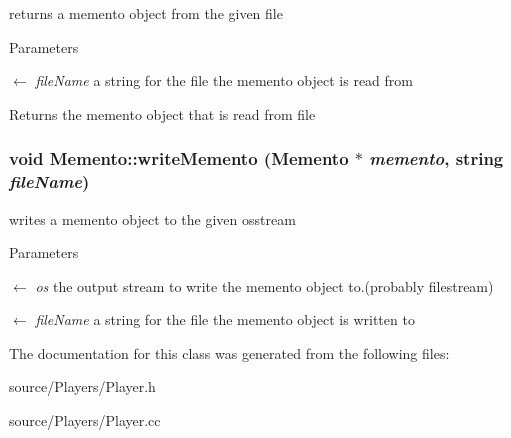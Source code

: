 returns a memento object from the given file 
\begin{DoxyParams}{Parameters}
\item[\mbox{$\leftarrow$} {\em fileName}]a string for the file the memento object is read from \end{DoxyParams}
\begin{DoxyReturn}{Returns}
the memento object that is read from file 
\end{DoxyReturn}
\hypertarget{classMemento_ae1c59cf9a5ed24dfcbe15d57ee24c095}{
\subsubsection[{writeMemento}]{\setlength{\rightskip}{0pt plus 5cm}void Memento::writeMemento ({\bf Memento} $\ast$ {\em memento}, \/  string {\em fileName})}}
\label{classMemento_ae1c59cf9a5ed24dfcbe15d57ee24c095}


writes a memento object to the given osstream 
\begin{DoxyParams}{Parameters}
\item[\mbox{$\leftarrow$} {\em os}]the output stream to write the memento object to.(probably filestream) \item[\mbox{$\leftarrow$} {\em fileName}]a string for the file the memento object is written to \end{DoxyParams}


The documentation for this class was generated from the following files:\begin{DoxyCompactItemize}
\item 
source/Players/Player.h\item 
source/Players/Player.cc\end{DoxyCompactItemize}
